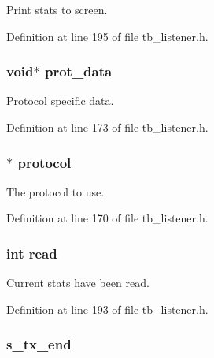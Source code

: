 Print stats to screen. 



Definition at line 195 of file tb\-\_\-listener.\-h.

\hypertarget{structtb__listener__t_ab79822e20d19ce95bdf8a3f95bd616d5}{
\subsubsection[{prot\-\_\-data}]{\setlength{\rightskip}{0pt plus 5cm}void$\ast$ prot\-\_\-data}}\label{structtb__listener__t_ab79822e20d19ce95bdf8a3f95bd616d5}


Protocol specific data. 



Definition at line 173 of file tb\-\_\-listener.\-h.

\hypertarget{structtb__listener__t_a0b0f6789be37cb22fa42abe30a271591}{
\subsubsection[{protocol}]{$\ast$ protocol}}\label{structtb__listener__t_a0b0f6789be37cb22fa42abe30a271591}


The protocol to use. 



Definition at line 170 of file tb\-\_\-listener.\-h.

\hypertarget{structtb__listener__t_ad91878c8e805d88354749a9fbfee4296}{
\subsubsection[{read}]{\setlength{\rightskip}{0pt plus 5cm}int read}}\label{structtb__listener__t_ad91878c8e805d88354749a9fbfee4296}


Current stats have been read. 



Definition at line 193 of file tb\-\_\-listener.\-h.

\hypertarget{structtb__listener__t_aea40caaca885ba5ed3e0b82d7ef1f498}{
\subsubsection[{s\-\_\-tx\-\_\-end}]{ s\-\_\-tx\-\_\-end}}\label{structtb__listener__t_aea40caaca885ba5ed3e0b82d7ef1f498}


